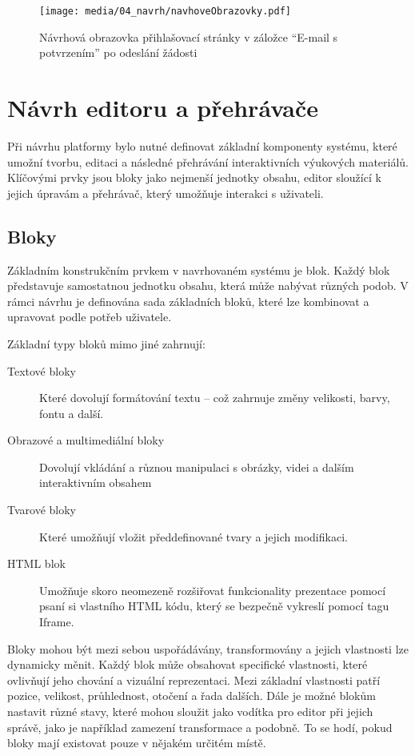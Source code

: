 \begin{figure}[ht!]
    \centering
    \texttt{[image: media/04\_navrh/navhoveObrazovky.pdf]}
    \caption{Návrhová obrazovka přihlašovací stránky v záložce \enquote{E-mail s potvrzením} po odeslání žádosti}\label{fig:navrhovaObrazovkaEmailAKod}
\end{figure}


\section{Návrh editoru a přehrávače}\label{text:navrh/editor_player}

Při návrhu platformy bylo nutné definovat základní komponenty systému, které umožní tvorbu, editaci a následné přehrávání interaktivních výukových materiálů. 
Klíčovými prvky jsou bloky jako nejmenší jednotky obsahu, editor sloužící k jejich úpravám a přehrávač, který umožňuje interakci s uživateli.

\subsection{Bloky}

Základním konstrukčním prvkem v navrhovaném systému je blok. 
Každý blok představuje samostatnou jednotku obsahu, která může nabývat různých podob. 
V rámci návrhu je definována sada základních bloků, které lze kombinovat a upravovat podle potřeb uživatele.

Základní typy bloků mimo jiné zahrnují:

\begin{description}
    \item[Textové bloky] Které dovolují formátování textu -- což zahrnuje změny velikosti, barvy, fontu a další.
    \item[Obrazové a multimediální bloky] Dovolují vkládání a různou manipulaci s obrázky, videi a dalším interaktivním obsahem
    \item[Tvarové bloky] Které umožňují vložit předdefinované tvary a jejich modifikaci.
    \item[HTML blok] Umožňuje skoro neomezeně rozšiřovat funkcionality prezentace pomocí psaní si vlastního HTML kódu, který se bezpečně vykreslí pomocí tagu Iframe.
\end{description}

Bloky mohou být mezi sebou uspořádávány, transformovány a jejich vlastnosti lze dynamicky měnit. 
Každý blok může obsahovat specifické vlastnosti, které ovlivňují jeho chování a vizuální reprezentaci.
Mezi základní vlastnosti patří pozice, velikost, průhlednost, otočení a řada dalších.
Dále je možné blokům nastavit různé stavy, které mohou sloužit jako vodítka pro editor při jejich správě, jako je například zamezení transformace a podobně.
To se hodí, pokud bloky mají existovat pouze v nějakém určitém místě.

